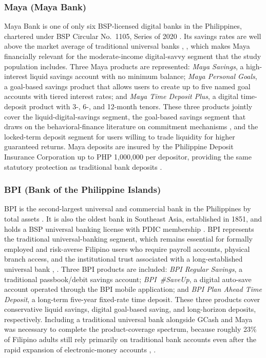 \documentclass{icsthesis}
\begin{document}
\begin{mainmatter}
				\subsubsection{Maya (Maya Bank)}
					Maya Bank is one of only six BSP-licensed digital banks in the Philippines, chartered under BSP Circular No.~1105, Series of 2020 \cite{ref36}. Its savings rates are well above the market average of traditional universal banks \cite{ref35}, \cite{ref9}, which makes Maya financially relevant for the moderate-income digital-savvy segment that the study population includes. Three Maya products are represented: \emph{Maya Savings}, a high-interest liquid savings account with no minimum balance; \emph{Maya Personal Goals}, a goal-based savings product that allows users to create up to five named goal accounts with tiered interest rates; and \emph{Maya Time Deposit Plus}, a digital time-deposit product with 3-, 6-, and 12-month tenors. These three products jointly cover the liquid-digital-savings segment, the goal-based savings segment that draws on the behavioral-finance literature on commitment mechanisms \cite{ref63}, and the locked-term deposit segment for users willing to trade liquidity for higher guaranteed returns. Maya deposits are insured by the Philippine Deposit Insurance Corporation up to PHP 1,000,000 per depositor, providing the same statutory protection as traditional bank deposits \cite{ref36}.

				\subsubsection{BPI (Bank of the Philippine Islands)}
					BPI is the second-largest universal and commercial bank in the Philippines by total assets \cite{ref37}. It is also the oldest bank in Southeast Asia, established in 1851, and holds a BSP universal banking license with PDIC membership \cite{ref37}. BPI represents the traditional universal-banking segment, which remains essential for formally employed and risk-averse Filipino users who require payroll accounts, physical branch access, and the institutional trust associated with a long-established universal bank \cite{ref35}, \cite{ref37}. Three BPI products are included: \emph{BPI Regular Savings}, a traditional passbook/debit savings account; \emph{BPI~\#SaveUp}, a digital auto-save account operated through the BPI mobile application; and \emph{BPI Plan Ahead Time Deposit}, a long-term five-year fixed-rate time deposit. These three products cover conservative liquid savings, digital goal-based saving, and long-horizon deposits, respectively. Including a traditional universal bank alongside GCash and Maya was necessary to complete the product-coverage spectrum, because roughly 23\% of Filipino adults still rely primarily on traditional bank accounts even after the rapid expansion of electronic-money accounts \cite{ref35}, \cite{ref66}.


\end{mainmatter}
\end{document}
